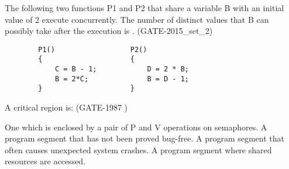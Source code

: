 
\begin{questyle}

  \question  The following two functions P1 and P2 that share a variable B with an initial
   value of 2 execute concurrently. The number of distinct values that B can possibly
   take after the execution is \fillin[3]. (GATE-2015\_set\_2)

  \begin{lstlisting}
        P1()                  P2()
        {                     {
            C = B - 1;            D = 2 * B;
            B = 2*C;              B = D - 1;
        }                     }
  \end{lstlisting}

  \end{questyle}



\begin{questyle}

  \question  A critical region is: (GATE-1987 )

  \begin{choices}
    \choice One which is enclosed by a pair of P and V operations on semaphores.
    \choice A program segment that has not been proved bug-free.
    \choice A program segment that often causes unexpected system crashes.
    \CorrectChoice A program segment where shared resources are accessed.
  \end{choices}

  \end{questyle}



